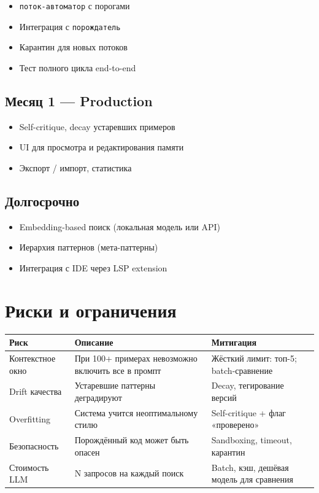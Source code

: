 \documentclass[12pt, a4paper, twoside]{article}
\begin{document}
\begin{itemize}[leftmargin=1.5em]
  \item \texttt{поток-автоматор} с порогами
  \item Интеграция с \texttt{порождатель}
  \item Карантин для новых потоков
  \item Тест полного цикла end-to-end
\end{itemize}

\subsection{Месяц 1 --- Production}

\begin{itemize}[leftmargin=1.5em]
  \item Self-critique, decay устаревших примеров
  \item UI для просмотра и редактирования памяти
  \item Экспорт / импорт, статистика
\end{itemize}

\subsection{Долгосрочно}

\begin{itemize}[leftmargin=1.5em]
  \item Embedding-based поиск (локальная модель или API)
  \item Иерархия паттернов (мета-паттерны)
  \item Интеграция с IDE через LSP extension
\end{itemize}

\section{Риски и ограничения}

\begin{center}
\begin{tabularx}{\textwidth}{lLl}
  \toprule
  \textbf{Риск} & \textbf{Описание} & \textbf{Митигация} \\
  \midrule
  Контекстное окно
    & При 100+ примерах невозможно включить все в промпт
    & Жёсткий лимит: топ-5; batch-сравнение \\
  Drift качества
    & Устаревшие паттерны деградируют
    & Decay, тегирование версий \\
  Overfitting
    & Система учится неоптимальному стилю
    & Self-critique + флаг «проверено» \\
  Безопасность
    & Порождённый код может быть опасен
    & Sandboxing, timeout, карантин \\
  Стоимость LLM
    & N запросов на каждый поиск
    & Batch, кэш, дешёвая модель для сравнения \\
  \bottomrule
\end{tabularx}
\end{center}
\end{document}
